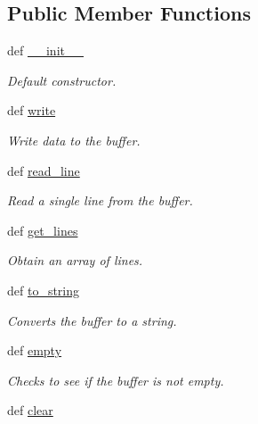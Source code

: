\subsection*{Public Member Functions}
\begin{DoxyCompactItemize}
\item 
def \hyperlink{class_connection_manager_1_1_buffer_ab23788175bcdf08a9e4f0c2c50c6ae25}{\-\_\-\-\_\-init\-\_\-\-\_\-}
\begin{DoxyCompactList}\small\item\em Default constructor. \end{DoxyCompactList}\item 
\hypertarget{class_connection_manager_1_1_buffer_a69798f2abe4f724882166a213c1479a6}{def \hyperlink{class_connection_manager_1_1_buffer_a69798f2abe4f724882166a213c1479a6}{write}}\label{class_connection_manager_1_1_buffer_a69798f2abe4f724882166a213c1479a6}

\begin{DoxyCompactList}\small\item\em Write data to the buffer. \end{DoxyCompactList}\item 
def \hyperlink{class_connection_manager_1_1_buffer_a4d5008eacce719e83798bfa23b7212b0}{read\-\_\-line}
\begin{DoxyCompactList}\small\item\em Read a single line from the buffer. \end{DoxyCompactList}\item 
def \hyperlink{class_connection_manager_1_1_buffer_ab99c940b49904019829273977e496e8a}{get\-\_\-lines}
\begin{DoxyCompactList}\small\item\em Obtain an array of lines. \end{DoxyCompactList}\item 
def \hyperlink{class_connection_manager_1_1_buffer_a27c0a434a0faa3994e7a215f37f5409f}{to\-\_\-string}
\begin{DoxyCompactList}\small\item\em Converts the buffer to a string. \end{DoxyCompactList}\item 
def \hyperlink{class_connection_manager_1_1_buffer_a8e7aa8daa70e06dbe7e7f3156bd198ce}{empty}
\begin{DoxyCompactList}\small\item\em Checks to see if the buffer is not empty. \end{DoxyCompactList}\item 
\hypertarget{class_connection_manager_1_1_buffer_afad92674c4836d90b663d6dd364bd026}{def \hyperlink{class_connection_manager_1_1_buffer_afad92674c4836d90b663d6dd364bd026}{clear}}\label{class_connection_manager_1_1_buffer_afad92674c4836d90b663d6dd364bd026}


\end{DoxyCompactItemize}
